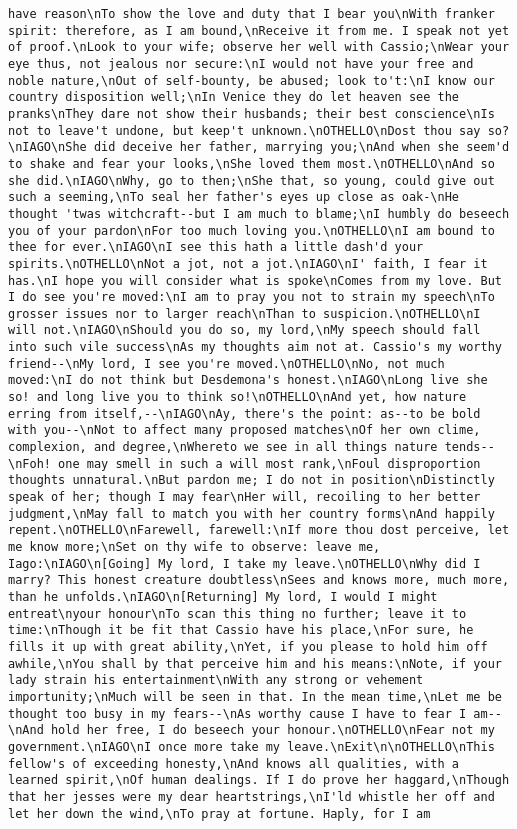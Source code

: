 \begin{verbatim}
have reason\nTo show the love and duty that I bear you\nWith franker spirit: therefore, as I am bound,\nReceive it from me. I speak not yet of proof.\nLook to your wife; observe her well with Cassio;\nWear your eye thus, not jealous nor secure:\nI would not have your free and noble nature,\nOut of self-bounty, be abused; look to't:\nI know our country disposition well;\nIn Venice they do let heaven see the pranks\nThey dare not show their husbands; their best conscience\nIs not to leave't undone, but keep't unknown.\nOTHELLO\nDost thou say so?\nIAGO\nShe did deceive her father, marrying you;\nAnd when she seem'd to shake and fear your looks,\nShe loved them most.\nOTHELLO\nAnd so she did.\nIAGO\nWhy, go to then;\nShe that, so young, could give out such a seeming,\nTo seal her father's eyes up close as oak-\nHe thought 'twas witchcraft--but I am much to blame;\nI humbly do beseech you of your pardon\nFor too much loving you.\nOTHELLO\nI am bound to thee for ever.\nIAGO\nI see this hath a little dash'd your spirits.\nOTHELLO\nNot a jot, not a jot.\nIAGO\nI' faith, I fear it has.\nI hope you will consider what is spoke\nComes from my love. But I do see you're moved:\nI am to pray you not to strain my speech\nTo grosser issues nor to larger reach\nThan to suspicion.\nOTHELLO\nI will not.\nIAGO\nShould you do so, my lord,\nMy speech should fall into such vile success\nAs my thoughts aim not at. Cassio's my worthy friend--\nMy lord, I see you're moved.\nOTHELLO\nNo, not much moved:\nI do not think but Desdemona's honest.\nIAGO\nLong live she so! and long live you to think so!\nOTHELLO\nAnd yet, how nature erring from itself,--\nIAGO\nAy, there's the point: as--to be bold with you--\nNot to affect many proposed matches\nOf her own clime, complexion, and degree,\nWhereto we see in all things nature tends--\nFoh! one may smell in such a will most rank,\nFoul disproportion thoughts unnatural.\nBut pardon me; I do not in position\nDistinctly speak of her; though I may fear\nHer will, recoiling to her better judgment,\nMay fall to match you with her country forms\nAnd happily repent.\nOTHELLO\nFarewell, farewell:\nIf more thou dost perceive, let me know more;\nSet on thy wife to observe: leave me, Iago:\nIAGO\n[Going] My lord, I take my leave.\nOTHELLO\nWhy did I marry? This honest creature doubtless\nSees and knows more, much more, than he unfolds.\nIAGO\n[Returning] My lord, I would I might entreat\nyour honour\nTo scan this thing no further; leave it to time:\nThough it be fit that Cassio have his place,\nFor sure, he fills it up with great ability,\nYet, if you please to hold him off awhile,\nYou shall by that perceive him and his means:\nNote, if your lady strain his entertainment\nWith any strong or vehement importunity;\nMuch will be seen in that. In the mean time,\nLet me be thought too busy in my fears--\nAs worthy cause I have to fear I am--\nAnd hold her free, I do beseech your honour.\nOTHELLO\nFear not my government.\nIAGO\nI once more take my leave.\nExit\n\nOTHELLO\nThis fellow's of exceeding honesty,\nAnd knows all qualities, with a learned spirit,\nOf human dealings. If I do prove her haggard,\nThough that her jesses were my dear heartstrings,\nI'ld whistle her off and let her down the wind,\nTo pray at fortune. Haply, for I am 
\end{verbatim}
